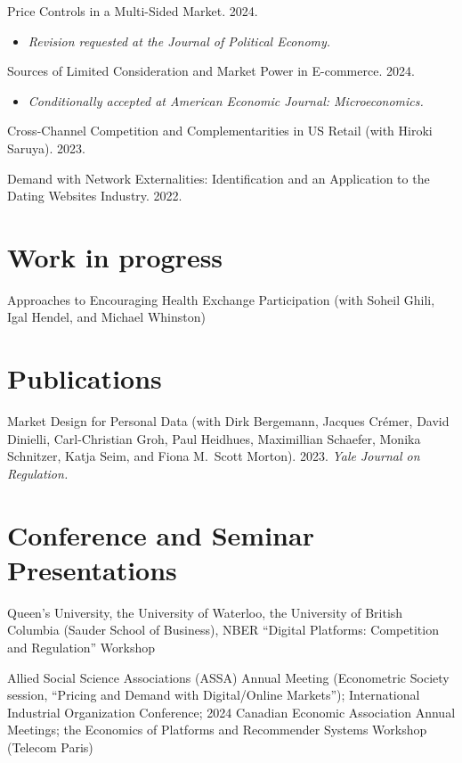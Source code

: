 \documentclass[11pt]{article} %
\begin{document}
Price Controls in a Multi-Sided Market. 2024. 
\begin{itemize}
	\item \textit{Revision requested at the Journal of Political Economy.}
\end{itemize}

\medskip

Sources of Limited Consideration and Market Power in E-commerce. 2024.
\begin{itemize}
	\item \textit{Conditionally accepted at American Economic Journal: Microeconomics.}
\end{itemize}

\medskip

Cross-Channel Competition and Complementarities in US Retail
(with Hiroki Saruya). 2023.

\medskip

 
Demand with Network Externalities: 
Identification and an Application to the Dating Websites Industry. 2022.

\section*{Work in progress}

Approaches to Encouraging Health Exchange Participation 
(with Soheil Ghili, Igal Hendel, and Michael Whinston)


\section*{Publications}

Market Design for Personal Data
(with Dirk Bergemann, Jacques Cr\'{e}mer, David Dinielli, 
Carl-Christian Groh, Paul Heidhues, Maximillian Schaefer, 
Monika Schnitzer, Katja Seim, and Fiona M.\ Scott Morton).
2023. \textit{Yale Journal on Regulation.}




\section*{Conference and Seminar Presentations}

 Queen's University, the University of Waterloo,
the University of British Columbia (Sauder School of Business),
NBER ``Digital Platforms: Competition and Regulation'' Workshop

 Allied Social Science Associations (ASSA) Annual Meeting
	(Econometric Society session, ``Pricing and Demand with Digital/Online Markets'');
	International Industrial Organization Conference;
	2024 Canadian Economic Association Annual Meetings;
		the Economics of Platforms and Recommender Systems Workshop (Telecom Paris)
	
\end{document}
